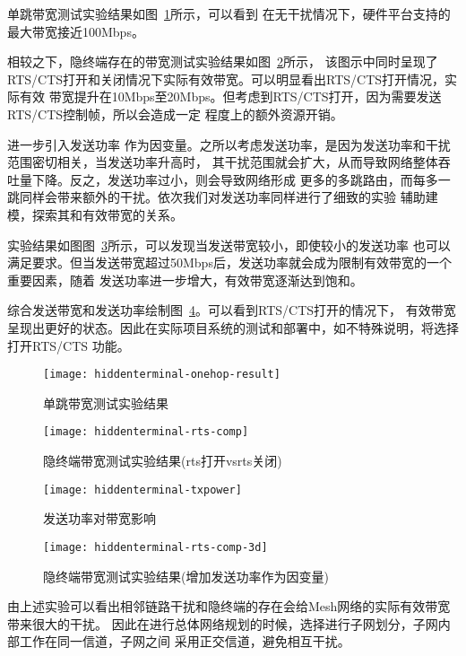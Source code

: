单跳带宽测试实验结果如图~\ref{fig:hiddenterminal-3}所示，可以看到
在无干扰情况下，硬件平台支持的最大带宽接近100Mbps。

相较之下，隐终端存在的带宽测试实验结果如图~\ref{fig:hiddenterminal-4}所示，
该图示中同时呈现了RTS/CTS打开和关闭情况下实际有效带宽。可以明显看出RTS/CTS打开情况，实际有效
带宽提升在10Mbps至20Mbps。但考虑到RTS/CTS打开，因为需要发送RTS/CTS控制帧，所以会造成一定
程度上的额外资源开销。

进一步引入发送功率
作为因变量。之所以考虑发送功率，是因为发送功率和干扰范围密切相关，当发送功率升高时，
其干扰范围就会扩大，从而导致网络整体吞吐量下降。反之，发送功率过小，则会导致网络形成
更多的多跳路由，而每多一跳同样会带来额外的干扰。依次我们对发送功率同样进行了细致的实验
辅助建模，探索其和有效带宽的关系。

实验结果如图图~\ref{fig:hiddenterminal-5}所示，可以发现当发送带宽较小，即使较小的发送功率
也可以满足要求。但当发送带宽超过50Mbps后，发送功率就会成为限制有效带宽的一个重要因素，随着
发送功率进一步增大，有效带宽逐渐达到饱和。

综合发送带宽和发送功率绘制图~\ref{fig:hiddenterminal-6}。可以看到RTS/CTS打开的情况下，
有效带宽呈现出更好的状态。因此在实际项目系统的测试和部署中，如不特殊说明，将选择打开RTS/CTS
功能。

\begin{figure}[H] %
  \centering
  \texttt{[image: hiddenterminal-onehop-result]}
  \caption{单跳带宽测试实验结果}
  \label{fig:hiddenterminal-3}
\end{figure}
\begin{figure}[H] %
  \centering
  \texttt{[image: hiddenterminal-rts-comp]}
  \caption{隐终端带宽测试实验结果(rts打开vsrts关闭)}
  \label{fig:hiddenterminal-4}
\end{figure}
\begin{figure}[H] %
  \centering
  \texttt{[image: hiddenterminal-txpower]}
  \caption{发送功率对带宽影响}
  \label{fig:hiddenterminal-5}
\end{figure}
\begin{figure}[H] %
  \centering
  \texttt{[image: hiddenterminal-rts-comp-3d]}
  \caption{隐终端带宽测试实验结果(增加发送功率作为因变量)}
  \label{fig:hiddenterminal-6}
\end{figure}

由上述实验可以看出相邻链路干扰和隐终端的存在会给Mesh网络的实际有效带宽带来很大的干扰。
因此在进行总体网络规划的时候，选择进行子网划分，子网内部工作在同一信道，子网之间
采用正交信道，避免相互干扰。

